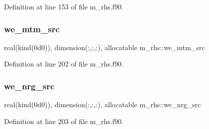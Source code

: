 Definition at line 153 of file m\+\_\+rhs.\+f90.

\mbox{\label{namespacem__rhs_ace0c30f610f7a6b9e87eadd79e7197c0}} 
\subsubsection{\texorpdfstring{we\+\_\+mtm\+\_\+src}{we\_mtm\_src}}
{\footnotesize\ttfamily real(kind(0d0)), dimension(\+:,\+:,\+:), allocatable m\+\_\+rhs\+::we\+\_\+mtm\+\_\+src}



Definition at line 202 of file m\+\_\+rhs.\+f90.

\mbox{\label{namespacem__rhs_adf3ae8008dd304f908c21bc0f0fcb2ac}} 
\subsubsection{\texorpdfstring{we\+\_\+nrg\+\_\+src}{we\_nrg\_src}}
{\footnotesize\ttfamily real(kind(0d0)), dimension(\+:,\+:,\+:), allocatable m\+\_\+rhs\+::we\+\_\+nrg\+\_\+src}



Definition at line 203 of file m\+\_\+rhs.\+f90.


